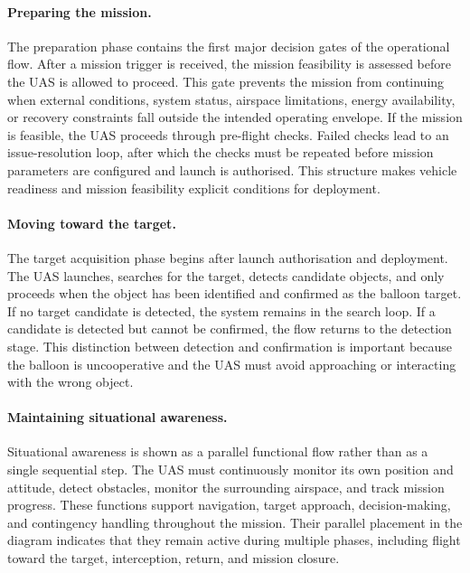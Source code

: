 \paragraph{Preparing the mission.}
The preparation phase contains the first major decision gates of the operational flow. After a mission trigger is received, the mission feasibility is assessed before the UAS is allowed to proceed. This gate prevents the mission from continuing when external conditions, system status, airspace limitations, energy availability, or recovery constraints fall outside the intended operating envelope. If the mission is feasible, the UAS proceeds through pre-flight checks. Failed checks lead to an issue-resolution loop, after which the checks must be repeated before mission parameters are configured and launch is authorised. This structure makes vehicle readiness and mission feasibility explicit conditions for deployment.
\vspace{-10pt}

\paragraph{Moving toward the target.}
The target acquisition phase begins after launch authorisation and deployment. The UAS launches, searches for the target, detects candidate objects, and only proceeds when the object has been identified and confirmed as the balloon target. If no target candidate is detected, the system remains in the search loop. If a candidate is detected but cannot be confirmed, the flow returns to the detection stage. This distinction between detection and confirmation is important because the balloon is uncooperative and the UAS must avoid approaching or interacting with the wrong object.
\vspace{-10pt}

\paragraph{Maintaining situational awareness.}
Situational awareness is shown as a parallel functional flow rather than as a single sequential step. The UAS must continuously monitor its own position and attitude, detect obstacles, monitor the surrounding airspace, and track mission progress. These functions support navigation, target approach, decision-making, and contingency handling throughout the mission. Their parallel placement in the diagram indicates that they remain active during multiple phases, including flight toward the target, interception, return, and mission closure.
\vspace{-10pt}

